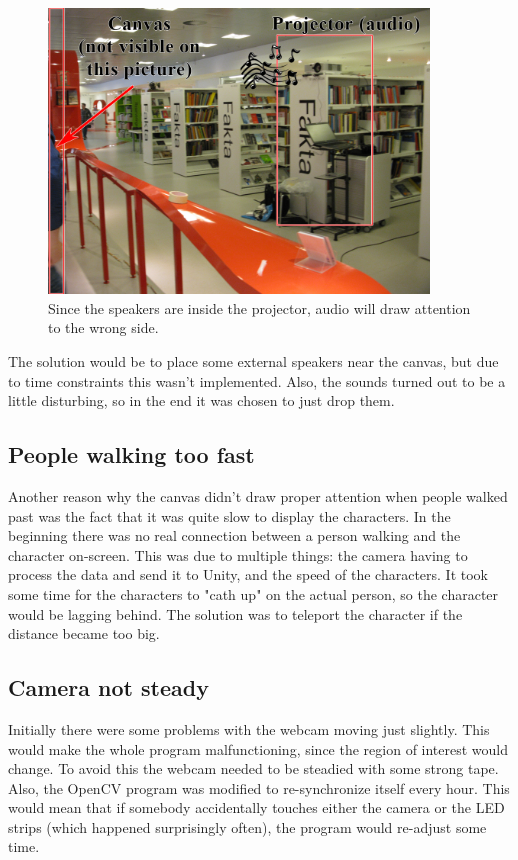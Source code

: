\begin{figure}[htbp]
\centering
\includegraphics[width=0.90\textwidth]{Pictures/Design/projector_audio}
\caption{Since the speakers are inside the projector, audio will draw attention to the wrong side.}
\label{fig:projector_audio}
\end{figure}

The solution would be to place some external speakers near the canvas, but due to time constraints this wasn't implemented. Also, the sounds turned out to be a little disturbing, so in the end it was chosen to just drop them.

\subsection{People walking too fast}
Another reason why the canvas didn't draw proper attention when people walked past was the fact that it was quite slow to display the characters. In the beginning there was no real connection between a person walking and the character on-screen. This was due to multiple things: the camera having to process the data and send it to Unity, and the speed of the characters. It took some time for the characters to "cath up" on the actual person, so the character would be lagging behind. The solution was to teleport the character if the distance became too big.

\subsection{Camera not steady}
Initially there were some problems with the webcam moving just slightly. This would make the whole program malfunctioning, since the region of interest would change. To avoid this the webcam needed to be steadied with some strong tape. Also, the OpenCV program was modified to re-synchronize itself every hour. This would mean that if somebody accidentally touches either the camera or the LED strips (which happened surprisingly often), the program would re-adjust some time.

